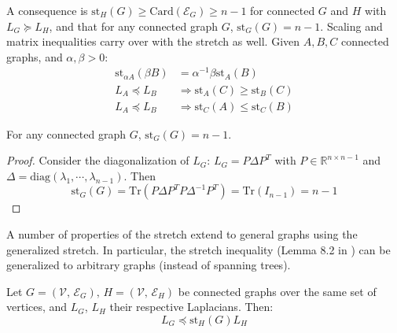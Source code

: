 A consequence is $\text{st}_{H}\left(G\right)\geq\text{Card}\left(\mathcal{E}_{G}\right)\geq n-1$
for connected $G$ and $H$ with $L_{G}\succeq L_{H}$, and that for
any connected graph $G$, $\text{st}_{G}\left(G\right)=n-1$. Scaling
and matrix inequalities carry over with the stretch as well. Given
$A,B,C$ connected graphs, and $\alpha,\beta>0$: 
\begin{align*}
\text{st}_{\alpha A}\left(\beta B\right) & =\alpha^{-1}\beta\text{st}_{A}\left(B\right)\\
L_{A}\preceq L_{B} & \Rightarrow\text{st}_{A}\left(C\right)\geq\text{st}_{B}\left(C\right)\\
L_{A}\preceq L_{B} & \Rightarrow\text{st}_{C}\left(A\right)\leq\text{st}_{C}\left(B\right)
\end{align*}

\begin{lemma}
For any connected graph $G$, $\text{st}_{G}\left(G\right)=n-1$.\end{lemma}
\begin{proof}
Consider the diagonalization of $L_{G}$: $L_{G}=P\Delta P^{T}$ with
$P\in\mathbb{R}^{n\times n-1}$ and $\Delta=\text{diag}\left(\lambda_{1},\cdots,\lambda_{n-1}\right)$.
Then 
\[
\text{st}_{G}\left(G\right)=\text{Tr}\left(P\Delta P^{T}P\Delta^{-1}P^{T}\right)=\text{Tr}\left(I_{n-1}\right)=n-1
\]

\end{proof}
A number of properties of the stretch extend to general graphs using
the generalized stretch. In particular, the stretch inequality (Lemma
8.2 in \cite{Spielman2009a}) can be generalized to arbitrary graphs
(instead of spanning trees).
\begin{lemma}
\label{lem:stretch-inequality}Let $G=\left(\mathcal{V},\,\mathcal{E}_{G}\right),\, H=\left(\mathcal{V},\,\mathcal{E}_{H}\right)$
be connected graphs over the same set of vertices, and $L_{G}$, $L_{H}$
their respective Laplacians. Then: 
\[
L_{G}\preceq\text{st}_{H}\left(G\right)L_{H}
\]
\end{lemma}
